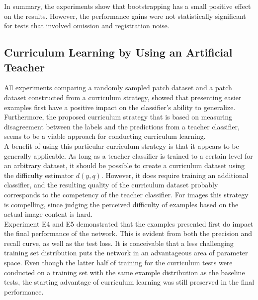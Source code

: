In summary, the experiments show that bootstrapping has a small positive effect on the results. However, the performance gains were not statistically significant for tests that involved omission and registration noise.\\


\subsection{Curriculum Learning by Using an Artificial Teacher}

All experiments comparing a randomly sampled patch dataset and a patch dataset constructed from a curriculum strategy, showed that presenting easier examples first have a positive impact on the classifier's ability to generalize. Furthermore, the proposed curriculum strategy that is based on measuring disagreement between the labels and the predictions  from a teacher classifier, seems to be a viable approach for conducting curriculum learning.\\

A benefit of using this particular curriculum strategy is that it appears to be generally applicable. As long as a teacher classifier is trained to a certain level for an arbitrary dataset, it should be possible to create a curriculum dataset using the difficulty estimator $d(y,q)$. However, it does require training an additional classifier, and the resulting quality of the curriculum dataset probably corresponds to the competency of the teacher classifier. For images this strategy is compelling, since judging the perceived difficulty of examples based on the actual image content is hard.\\

Experiment E4 and E5 demonstrated that the examples presented first do impact the final performance of the network. This is evident from both the precision and recall curve, as well as the test loss. It is conceivable that a less challenging training set distribution puts the network in an advantageous area of parameter space. Even though the latter half of training for the curriculum tests were conducted on a training set with the same example distribution as the baseline tests, the starting advantage of curriculum learning was still preserved in the final performance.  \\

